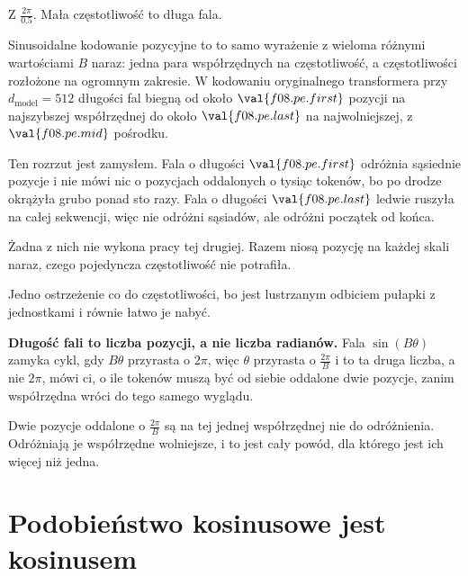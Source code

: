 \begin{fr}
\ans{$4\pi$}
Z $\frac{2\pi}{\num{0.5}}$. Mała częstotliwość to długa fala.

\begin{aibox}
Sinusoidalne kodowanie pozycyjne to to samo wyrażenie z wieloma różnymi
wartościami $B$ naraz: jedna para współrzędnych na częstotliwość, a
częstotliwości rozłożone na ogromnym zakresie. W kodowaniu oryginalnego
transformera przy $d_{\text{model}} = 512$ długości fal biegną od około
$\val{f08.pe.first}$ pozycji na najszybszej współrzędnej do około
$\val{f08.pe.last}$ na najwolniejszej, z $\val{f08.pe.mid}$ pośrodku.

Ten rozrzut jest zamysłem. Fala o długości $\val{f08.pe.first}$ odróżnia
sąsiednie pozycje i nie mówi nic o pozycjach oddalonych o tysiąc tokenów, bo
po drodze okrążyła grubo ponad sto razy. Fala o długości
$\val{f08.pe.last}$ ledwie ruszyła na całej sekwencji, więc nie odróżni
sąsiadów, ale odróżni początek
od końca.

Żadna z nich nie wykona pracy tej drugiej. Razem niosą pozycję na każdej
skali naraz, czego pojedyncza częstotliwość nie potrafiła.
\end{aibox}
\end{fr}

\begin{fr}
Jedno ostrzeżenie co do częstotliwości, bo jest lustrzanym odbiciem pułapki z
jednostkami i równie łatwo je nabyć.

\textbf{Długość fali to liczba pozycji, a nie liczba radianów.} Fala
$\sin(B\theta)$ zamyka cykl, gdy $B\theta$ przyrasta o $2\pi$, więc $\theta$
przyrasta o $\frac{2\pi}{B}$ \dash{} i to ta druga liczba, a nie $2\pi$, mówi
ci, o ile tokenów muszą być od siebie oddalone dwie pozycje, zanim
współrzędna wróci do tego samego wyglądu.

Dwie pozycje oddalone o $\frac{2\pi}{B}$ są na tej jednej współrzędnej nie do
odróżnienia. Odróżniają je współrzędne wolniejsze, i to jest cały powód, dla
którego jest ich więcej niż jedna.
\end{fr}

\section{Podobieństwo kosinusowe jest kosinusem}
\label{sec:F08-cosine-similarity}

